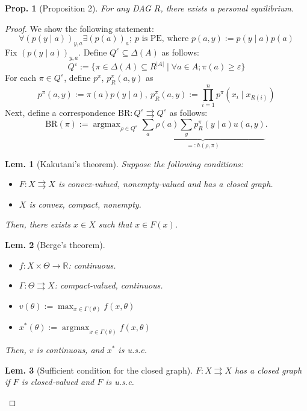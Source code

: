 \documentclass[11pt,a4paper,dvipdfmx]{article}
\theoremstyle{plain}
\newtheorem{lem}{Lem.}[section]
\newtheorem{prop}{Prop.}[section]
\newcommand{\R}{\mathbb{R}}
\renewcommand{\epsilon}{\varepsilon}
\DeclareMathOperator*{\argmax}{argmax}
\begin{document}
\begin{prop}[Proposition 2]
	For any DAG $R$, there exists a personal equilibrium.
\end{prop}
\begin{proof}
	We show the following statement:
	\[
	\forall (p(y \mid a))_{y,a} \exists (p(a))_a; \ p \text{ is PE, where }
	p(a, y) := p(y \mid a) p(a)
	\]
	Fix $(p(y \mid a))_{y,a}$. Define $Q^\epsilon \subseteq \Delta(A)$ as follows:
	\[
	Q^\epsilon := \{\pi \in \Delta(A) \subseteq R^{|A|} \mid \forall a \in A; \pi(a) \geq \epsilon \}
	\]
	For each $\pi \in Q^\epsilon$, define $p^\pi$, $p^\pi_R(a,y)$ as
	\[
	p^\pi (a,y) := \pi(a) p(y \mid a), \ p^\pi_R(a, y) := \prod_{i=1}^n p^\pi(x_i \mid x_{R(i)})
	\]
	Next, define a correspondence $\text{BR}: Q^\epsilon \rightrightarrows Q^\epsilon$ as follows:
	\[
	\text{BR}(\pi) := 
	\argmax_{\rho \in Q^\epsilon}
	\underbrace{
	\sum_a \rho(a) \sum_y p_R^\pi (y \mid a) u(a, y)}_{=: h(\rho, \pi)}.
	\]
	
	\begin{lem}[Kakutani's theorem]
	Suppose the following conditions:
	\begin{itemize}
		\item $F: X \rightrightarrows X$ is convex-valued, nonempty-valued and has a closed graph.
		\item $X$ is convex, compact, nonempty.
	\end{itemize}
	Then, there exists $x \in X$ such that $x \in F(x)$.
	\end{lem}
	
	\begin{lem}[Berge's theorem]
	\begin{itemize}
		\item $f: X \times \Theta \to \R$: continuous.
		\item $\Gamma: \Theta \rightrightarrows X$: compact-valued, continuous.
		\item $v(\theta) := \max_{x \in \Gamma(\theta)} f(x, \theta)$
		\item $x^*(\theta) := \argmax_{x \in \Gamma(\theta)} f(x, \theta)$
	\end{itemize}
	Then, $v$ is continuous, and $x^*$ is u.s.c.
	\end{lem}
	
	\begin{lem}[Sufficient condition for the closed graph]
		$F: X \rightrightarrows X$ has a closed graph if $F$ is closed-valued and $F$ is u.s.c.
	\end{lem}


\end{proof}
\end{document}
